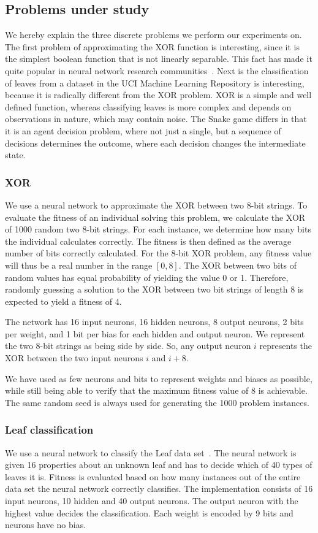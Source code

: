 \subsection{Problems under study}
\label{sec:problems}
We hereby explain the three discrete problems we perform our experiments on. The first problem of approximating the XOR function is interesting, since it is the simplest boolean function that is not linearly separable. This fact has made it quite popular in neural network research communities~\cite{masterThesisGANN}. Next is the classification of leaves from a dataset in the UCI Machine Learning Repository is interesting, because it is radically different from the XOR problem. XOR is a simple and well defined function, whereas classifying leaves is more complex and depends on observations in nature, which may contain noise. The Snake game differs in that it is an agent decision problem, where not just a single, but a sequence of decisions determines the outcome, where each decision changes the intermediate state.

\subsubsection{XOR}
We use a neural network to approximate the XOR between two 8-bit strings. To evaluate the fitness of an individual solving this problem, we calculate the XOR of \num{1000} random two 8-bit strings. For each instance, we determine how many bits the individual calculates correctly. The fitness is then defined as the average number of bits correctly calculated. For the 8-bit XOR problem, any fitness value will thus be a real number in the range $[0, 8]$. The XOR between two bits of random values has equal probability of yielding the value 0 or 1. Therefore, randomly guessing a solution to the XOR between two bit strings of length 8 is expected to yield a fitness of 4.

The network has 16 input neurons, 16 hidden neurons, 8 output neurons, 2 bits per weight, and 1 bit per bias for each hidden and output neuron. We represent the two 8-bit strings as being side by side. So, any output neuron $i$ represents the XOR between the two input neurons $i$ and $i + 8$. 

We have used as few neurons and bits to represent weights and biases as possible, while still being able to verify that the maximum fitness value of 8 is achievable.
The same random seed is always used for generating the 1000 problem instances.

\subsubsection{Leaf classification}
We use a neural network to classify the Leaf data set~\cite{Bache+Lichman:2013, leafdataset}. The neural network is given 16 properties about an unknown leaf and has to decide which of 40 types of leaves it is. Fitness is evaluated based on how many instances out of the entire data set the neural network correctly classifies.
The implementation consists of 16 input neurons, 10 hidden and 40 output neurons. The output neuron with the highest value decides the classification. Each weight is encoded by 9 bits and neurons have no bias.


